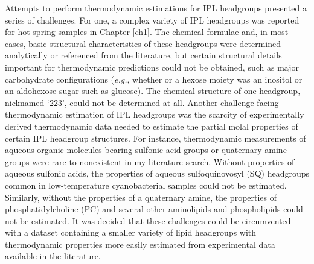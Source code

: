 Attempts to perform thermodynamic estimations for IPL headgroups presented a series of challenges. For one, a complex variety of IPL headgroups was reported for hot spring samples in Chapter \ref{ch1}. The chemical formulae and, in most cases, basic structural characteristics of these headgroups were determined analytically or referenced from the literature, but certain structural details important for thermodynamic predictions could not be obtained, such as major carbohydrate configurations (\textit{e.g.}, whether or a hexose moiety was an inositol or an aldohexose sugar such as glucose). The chemical structure of one headgroup, nicknamed `223', could not be determined at all. Another challenge facing thermodynamic estimation of IPL headgroups was the scarcity of experimentally derived thermodynamic data needed to estimate the partial molal properties of certain IPL headgroup structures. For instance, thermodynamic measurements of aqueous organic molecules bearing sulfonic acid groups or quaternary amine groups were rare to nonexistent in my literature search. Without properties of aqueous sulfonic acids, the properties of aqueous sulfoquinovosyl (SQ) headgroups common in low-temperature cyanobacterial samples could not be estimated. Similarly, without the properties of a quaternary amine, the properties of phosphatidylcholine (PC) and several other aminolipids and phospholipids could not be estimated. It was decided that these challenges could be circumvented with a dataset containing a smaller variety of lipid headgroups with thermodynamic properties more easily estimated from experimental data available in the literature.


